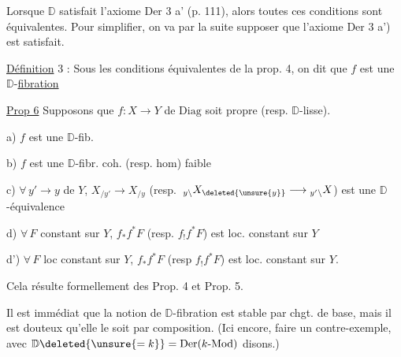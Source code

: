 Lorsque $\mathbb D$ satisfait l'axiome Der 3 a' (p. 111), alors toutes ces conditions  sont équivalentes.  Pour simplifier, on va par la suite supposer que l'axiome Der 3 a') est satisfait.

\uline{Définition} 3 : Sous les conditions équivalentes  de la prop. 4, on dit que $f$ est une $\mathbb D$-\uline{fibration}



\uline{Prop 6} Supposons que $f:X\longrightarrow Y$ de $\mathrm{Diag}$ soit propre (resp. $\mathbb D$-lisse).  

a) $f$ est une $\mathbb D$-fib. 

b) $f$ est une $\mathbb D$-fibr. coh. (resp. hom) faible

c) $\forall\,y'\longrightarrow y$ de $Y$, $X_{/y'}\longrightarrow X_{/y}$ (resp. $\,{}_{y\backslash}X_{\deleted{\unsure{y}}}\longrightarrow{}_{y'\backslash}X$) est une $\mathbb D$-équivalence

d) $\forall\,F$ constant sur $Y$, $f_*f^*F$ (resp. $f_!f^*F$) est loc. constant sur $Y$

d') $\forall\,F$ loc constant sur $Y$, $f_*f^*F$ (resp $f_!f^*F$) est loc. constant sur $Y$.

Cela résulte formellement des Prop. 4 et Prop. 5.


Il est immédiat que la notion de $\mathbb D$-fibration est stable par chgt. de base, mais il est douteux qu'elle le soit par composition. (Ici encore,   faire un contre-exemple, avec $\mathbb D\deleted{\unsure{=k}}=\mathrm{Der}(k\text{-}\mathrm{Mod})$ disons.)

